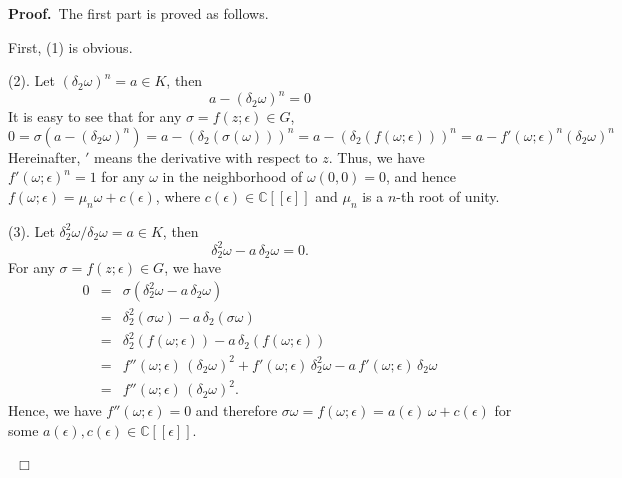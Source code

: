 \documentclass[preprint, 12pt]{elsarticle}
\numberwithin{equation}{section}
\newenvironment{proof}[1][Proof]{\textbf{#1.}\ }{\ $\Box$}
\newcommand{\Comp}{\mathbb{C}}
\begin{document}
\begin{proof}The first part is proved as follows.

First, (1) is obvious.

(2). Let $(\delta_2\omega)^n  = a\in K$, then
$$a - (\delta_2\omega)^n = 0$$
It is easy to see that for any $\sigma = f(z;\epsilon)\in G$,
$$0  = \sigma (a - (\delta_2\omega)^n) = a - (\delta_2(\sigma(\omega)))^n = a - (\delta_2(f(\omega;\epsilon)))^n = a - f'(\omega;\epsilon)^n(\delta_2\omega)^n$$
Hereinafter, $'$ means the derivative with respect to $z$. Thus,
we have $f'(\omega;\epsilon)^n = 1$ for any $\omega$ in the neighborhood of $\omega(0,0) = 0$, and hence
$f(\omega;\epsilon) = \mu_n\omega + c(\epsilon)$, where
$c(\epsilon)\in \Comp[[\epsilon]]$ and
$\mu_n$ is a $n$-th root of unity.

(3). Let $\delta_2^2\omega/\delta_2\omega = a\in K$, then
$$\delta_2^2\omega - a\,\delta_2\omega = 0.$$
For any $\sigma = f(z;\epsilon)\in G$, we have
\begin{eqnarray*}
0 &=& \sigma(\delta_2^2\omega - a\,\delta_2\omega)\\
&=&\delta_2^2(\sigma\omega) - a\,\delta_2(\sigma\omega)\\
&=&\delta_2^2(f(\omega;\epsilon)) - a\,\delta_2(f(\omega;\epsilon))\\
&=&f''(\omega;\epsilon)\,(\delta_2\omega)^2 +
f'(\omega;\epsilon)\,\delta_2^2\omega
- a\,f'(\omega;\epsilon)\,\delta_2\omega\\
&=&f''(\omega;\epsilon)\,(\delta_2\omega)^2.
\end{eqnarray*}
Hence, we have $f''(\omega;\epsilon) = 0$ and therefore
$\sigma\omega = f(\omega;\epsilon) = a(\epsilon)\,\omega +
c(\epsilon)$ for some $a(\epsilon), c(\epsilon)\in
\Comp[[\epsilon]]$.


\end{proof}
\end{document}

